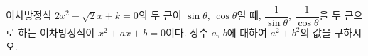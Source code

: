 이차방정식 $2x^2-\sqrt{2}x+k=0$의 두 근이 $\sin\theta$, $\cos\theta$일 때, $\dfrac{1}{\sin\theta}$, $\dfrac{1}{\cos\theta}$을 두 근으로 하는 이차방정식이 $x^2+ax+b=0$이다. 상수 $a$, $b$에 대하여 $a^2+b^2$의 값을 구하시오. 

